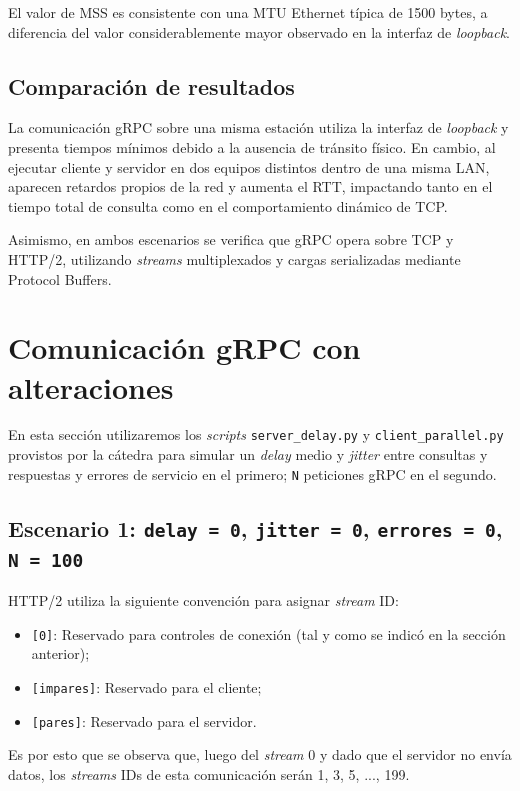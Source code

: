 \documentclass[a4paper,12pt]{article}
\begin{document}
El valor de MSS es consistente con una MTU Ethernet típica de 1500 bytes, a diferencia del valor considerablemente mayor observado en la interfaz de \textit{loopback}.

\subsection{Comparación de resultados}

La comunicación gRPC sobre una misma estación utiliza la interfaz de \textit{loopback} y presenta tiempos mínimos debido a la ausencia de tránsito físico. En cambio, al ejecutar cliente y servidor en dos equipos distintos dentro de una misma LAN, aparecen retardos propios de la red y aumenta el RTT, impactando tanto en el tiempo total de consulta como en el comportamiento dinámico de TCP.

Asimismo, en ambos escenarios se verifica que gRPC opera sobre TCP y HTTP/2, utilizando \textit{streams} multiplexados y cargas serializadas mediante Protocol Buffers.

\section{Comunicación gRPC con alteraciones}
En esta sección utilizaremos los \textit{scripts} \texttt{server\_delay.py} y \texttt{client\_parallel.py} provistos por la cátedra para simular un \textit{delay} medio y \textit{jitter} entre consultas y respuestas y errores de servicio en el primero; \texttt{N} peticiones gRPC en el segundo.

\subsection{Escenario 1: \texttt{delay = 0}, \texttt{jitter = 0}, \texttt{errores = 0}, \texttt{N = 100} }

HTTP/2 utiliza la siguiente convención para asignar \textit{stream} ID:
\begin{itemize}
    \item \texttt{[0]}: Reservado para controles de conexión (tal y como se indicó en la sección anterior);
    \item \texttt{[impares]}: Reservado para el cliente;
    \item \texttt{[pares]}: Reservado para el servidor. 
\end{itemize}
Es por esto que se observa que, luego del \textit{stream} 0 y dado que el servidor no envía datos, los \textit{streams} IDs de esta comunicación serán 1, 3, 5, ..., 199.
\end{document}
